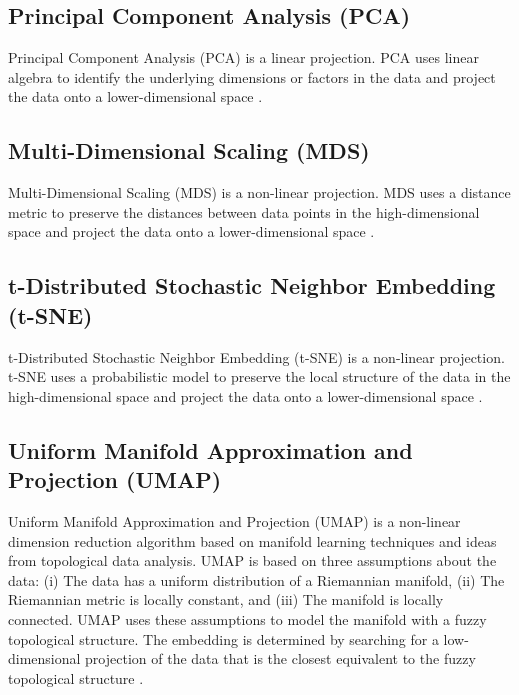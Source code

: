 \subsection{Principal Component Analysis (PCA)}

Principal Component Analysis (PCA) is a linear projection. PCA uses
linear algebra to identify the underlying dimensions or factors in the
data and project the data onto a lower-dimensional space
\parencite{abdi2010principal}.


\subsection{Multi-Dimensional Scaling (MDS)}

Multi-Dimensional Scaling (MDS) is a non-linear projection. MDS uses a
distance metric to preserve the distances between data points in the
high-dimensional space and project the data onto a lower-dimensional
space \parencite{morrison2003fast}.


\subsection{t-Distributed Stochastic Neighbor Embedding (t-SNE)}

t-Distributed Stochastic Neighbor Embedding (t-SNE) is a non-linear
projection. t-SNE uses a probabilistic model to preserve the local
structure of the data in the high-dimensional space and project the
data onto a lower-dimensional space \parencite{van2008visualizing}.


\subsection{Uniform Manifold Approximation and Projection (UMAP)}

Uniform Manifold Approximation and Projection (UMAP) is a non-linear
dimension reduction algorithm based on manifold learning techniques and
ideas from topological data analysis. UMAP is based on three assumptions
about the data: (i) The data has a uniform distribution of a Riemannian
manifold, (ii) The Riemannian metric is locally constant, and (iii) The
manifold is locally connected. UMAP uses these assumptions to model the
manifold with a fuzzy topological structure. The embedding is determined
by searching for a low-dimensional projection of the data that is the
closest equivalent to the fuzzy topological structure
\parencite{mcinnes2018umap}.




